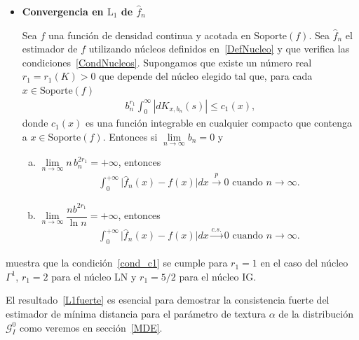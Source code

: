 \begin{itemize}
\item \textbf{Convergencia en $\text{L}_1$ de $\widehat{f}_n$}

\begin{theorem}
	\label{ConvergenciaFuerte}
	\bigskip
	Sea $f$ una función de densidad continua y acotada en $\text{Soporte}(f)$.
	Sea $\widehat{f}_{n}$ el estimador de $f$ utilizando núcleos definidos en~\ref{DefNucleo} y que verifica las condiciones~\ref{CondNucleos}. Supongamos que existe un número real $r_1=r_1(K)>0$ que depende del núcleo elegido tal que, para cada $x \in \text{Soporte}(f)$ 
	\begin{align}
	\label{cond_c1}
	b_n^{r_1} \displaystyle{\int_0^{\infty}} | dK_{x,b_n}(s) | \leq c_1(x),
	\end{align}
	donde $c_1(x)$ es una función integrable en cualquier compacto que contenga a $x \in \text{Soporte}(f)$. Entonces si $\lim\limits_{n \rightarrow \infty} b_n=0 $ y
	\begin{enumerate}[a)]
		\item $\lim\limits_{n \rightarrow \infty} n \, b_n^{2r_1}=+\infty$,  entonces
		\begin{align}
		\int_0^{+\infty} \vert \widehat{f}_n(x)-f(x)\vert dx \stackrel{p} {\longrightarrow} 0 \text{ cuando } n \rightarrow \infty.
		\label{L1debil}
		\end{align}
		\item $\lim\limits_{n \to \infty} \dfrac{n b^{2r_1}}{\ln{n}}  = +\infty $, entonces 
		\begin{align}
		\int_0^{+\infty} \vert \widehat{f}_n(x)-f(x)\vert dx \stackrel{c.s.} {\longrightarrow} 0 \text{ cuando } n \rightarrow \infty.
		\label{L1fuerte}
		\end{align}
	\end{enumerate}
\end{theorem}

\end{itemize}

\citet{Libnegue2013} muestra que la condición~\ref{cond_c1} se cumple para $r_1=1$ en el caso del núcleo $\Gamma^1$, $r_1=2$ para el núcleo LN y $r_1=5/2$ para el núcleo IG.

El resultado~\ref{L1fuerte} es esencial para demostrar la consistencia fuerte del estimador de mínima distancia para el parámetro de textura $\alpha$ de la distribución $\mathcal{G}_I^0$ como veremos en sección~\ref{MDE}.

